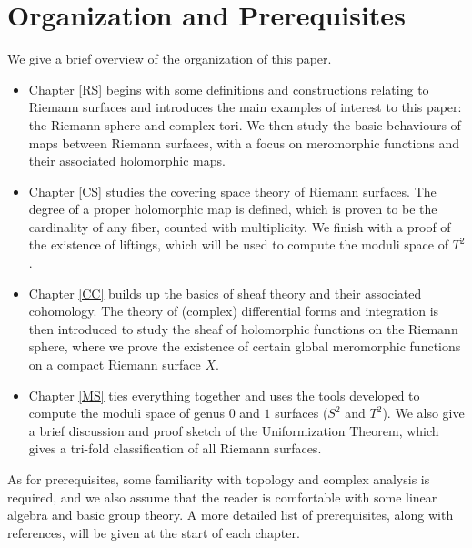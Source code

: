 \documentclass[../Moduli_Spaces_of_Riemann_Surfaces.tex]{subfiles}
\begin{document}
    \section{Organization and Prerequisites}
    We give a brief overview of the organization of this paper.
    \begin{itemize}
        \item Chapter \ref{RS} begins with some definitions and constructions relating to Riemann surfaces and introduces the main examples of interest to this paper: the Riemann sphere and complex tori. We then study the basic behaviours of maps between Riemann surfaces, with a focus on meromorphic functions and their associated holomorphic maps.
            \vspace{-0.05in}
        \item Chapter \ref{CS} studies the covering space theory of Riemann surfaces. The degree of a proper holomorphic map is defined, which is proven to be the cardinality of any fiber, counted with multiplicity. We finish with a proof of the existence of liftings, which will be used to compute the moduli space of $T^2$.
            \vspace{-0.05in}
        \item Chapter \ref{CC} builds up the basics of sheaf theory and their associated cohomology. The theory of (complex) differential forms and integration is then introduced to study the sheaf of holomorphic functions on the Riemann sphere, where we prove the existence of certain global meromorphic functions on a compact Riemann surface $X$.
            \vspace{-0.05in}
        \item Chapter \ref{MS} ties everything together and uses the tools developed to compute the moduli space of genus $0$ and $1$ surfaces ($S^2$ and $T^2$). We also give a brief discussion and proof sketch of the Uniformization Theorem, which gives a tri-fold classification of all Riemann surfaces.
    \end{itemize}
    As for prerequisites, some familiarity with topology and complex analysis is required, and we also assume that the reader is comfortable with some linear algebra and basic group theory. A more detailed list of prerequisites, along with references, will be given at the start of each chapter.
\end{document}
